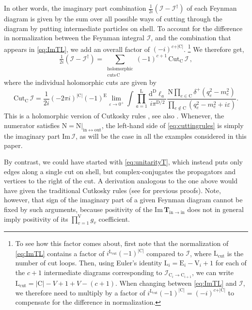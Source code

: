 \documentclass[12pt]{article}
\numberwithin{figure}{section}
\def \be {\begin{equation}}
\def \ee {\end{equation}}
\def \CC {C}
\def \D {\mathrm{D}}
\def \E {\mathrm{E}}
\def \L {\mathrm{L}}
\def \d {\mathrm{d}}
\def \eps {\varepsilon}
\def \CC {\mathrm{C}}
\def \I {\mathcal{I}}
\def \Im {\mathrm{Im}}
\def \Cut {\mathrm{Cut}}
\def \inn {\mathrm{in}}
\def \out {\mathrm{out}}
\def \T {\mathbf{T}}
\def \VV {\mathrm{V}}
\newcommand{\cut}{\text{Cut}}
\begin{document}
	
	In other words, the imaginary part combination $\tfrac{1}{2i}( \I - \I^\dagger)$ of each Feynman diagram is given by the sum over all possible ways of cutting through the diagram by putting intermediate particles on shell. To account for the difference in normalization between the Feynman integral $\I$, and the combination that appears in \eqref{eq:ImTL}, we add an overall factor of $(-i)^{c+\vert \CC \vert}$.%
	\footnote{To see how this factor comes about, first note that the normalization of \eqref{eq:ImTL} contains a factor of $i^{\L_{\text{cut}}}(-1)^{\vert \CC \vert}$ compared to $\I$, where $\L_{\text{cut}}$ is the number of cut loops. Then, using Euler's identity $\L_i=\E_i{-}\VV_i{+}1$ for each of the $c+1$ intermediate diagrams corresponding to $\I_{\CC_i \to \CC_{i+1}}$, we can write $\L_{\text{cut}}=\vert \CC \vert-V+1+V-(c+1)$. When changing between \eqref{eq:ImTL} and $\I$, we therefore need to multiply by a factor of $i^{\L_{\text{cut}}}(-1)^{\vert \CC \vert}=(-i)^{c+\vert \CC \vert}$ to compensate for the difference in normalization.}
	We therefore get,
    \be\boxed{
        \tfrac{1}{2i}( \I - \I^\dagger) =
        \sum_{\substack{\mathrm{holomorphic}\\ \mathrm{cuts}\,\CC}} (-1)^{c+1}\, \cut_\CC \, \I
        \,,}
        \label{eq:cuttingrules}
    \ee
	where the individual holomorphic cuts are given by
    \be
    \Cut_{\CC} \, \I = \frac{1}{2 i} (-2\pi i)^{|\CC|} \left(-1\right)^\E  \lim_{\eps \to 0^+} \int \prod_{a=1}^{\L} \frac{\d^\D \ell_a}{ i\pi^{\D/2}} \frac{\mathrm{N}\prod_{e \in \CC} \delta^+(q_e^2 - m_e^2)}{\prod_{e\notin \CC}(q_e^2 - m_e^2 + i\eps)}.
    \label{eq:cuts}
    \ee
    This is a holomorphic version of Cutkosky rules \cite{Cutkosky:1960sp}, see also \cite{Coster:1970jy,Bourjaily:2020wvq,Blazek:2021olf,Blazek:2021zoj}. Whenever, the numerator satisfies $\mathrm{N} = \mathrm{N}|_{\inn \leftrightarrow \out}$, the left-hand side of \eqref{eq:cuttingrules} is simply the imaginary part $\Im\, \I$, as will be the case in all the examples considered in this paper.
    
    
    
    By contrast, we could have started with \eqref{eq:unitarityT}, which instead puts only edges along a single cut on shell, but complex-conjugates the propagators and vertices to the right of the cut. A derivation analogous to the one above would have given the traditional Cutkosky rules (see \cite{Veltman:1963th,tHooft:1973wag,Sterman:1993hfp,Bloch:2015efx,Pius:2018crk} for previous proofs). Note, however, that sign of the imaginary part of a given Feynman diagram cannot be fixed by such arguments, because positivity of the $\Im\, \T_{\inn\to\inn}$ does not in general imply positivity of its $\prod_{v=1}^{\mathrm{V}}g_v$ coefficient.
	
\end{document}
